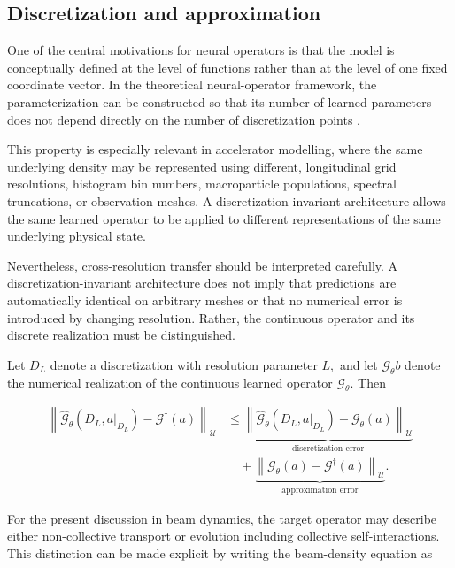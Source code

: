 \subsection{Discretization and approximation}
\label{sec:04_machine_learning_methodology_discretization_and_approximation}

One of the central motivations for neural operators is that the model is conceptually defined at the level of functions rather than at the level of one fixed coordinate vector. In the theoretical neural-operator framework, the parameterization can be constructed so that its number of learned parameters does not depend directly on the number of discretization points \cite{kovachki2023operators}.

This property is especially relevant in accelerator modelling, where the same underlying density may be represented using different, longitudinal grid resolutions, histogram bin numbers, macroparticle populations, spectral truncations, or observation meshes. A discretization-invariant architecture allows the same learned operator to be applied to different representations of the same underlying physical state.

Nevertheless, cross-resolution transfer should be interpreted carefully. A discretization-invariant architecture does not imply that predictions are automatically identical on arbitrary meshes or that no numerical error is introduced by changing resolution. Rather, the continuous operator and its discrete realization must be distinguished.

Let \(D_{L}\) denote a discretization with resolution parameter \(L ,\) and let \(\mathcal{G}_{\theta} b\) denote the numerical realization of the continuous learned operator \(\mathcal{G}_{\theta} .\) Then

\begin{equation}
\label{eq:86}
\begin{aligned}\left\|\widehat{\mathcal G}_{\theta}(D_L,a|_{D_L})-\mathcal G^{\dagger}(a)\right\|_{\mathcal U}&\le\underbrace{\left\|\widehat{\mathcal G}_{\theta}(D_L,a|_{D_L})-\mathcal G_{\theta}(a)\right\|_{\mathcal U}}_{\text{discretization error}}\\&\quad+\underbrace{\left\|\mathcal G_{\theta}(a)-\mathcal G^{\dagger}(a)\right\|_{\mathcal U}}_{\text{approximation error}}.\end{aligned}
\end{equation}

For the present discussion in beam dynamics, the target operator may describe either non-collective transport or evolution including collective self-interactions. This distinction can be made explicit by writing the beam-density equation as

